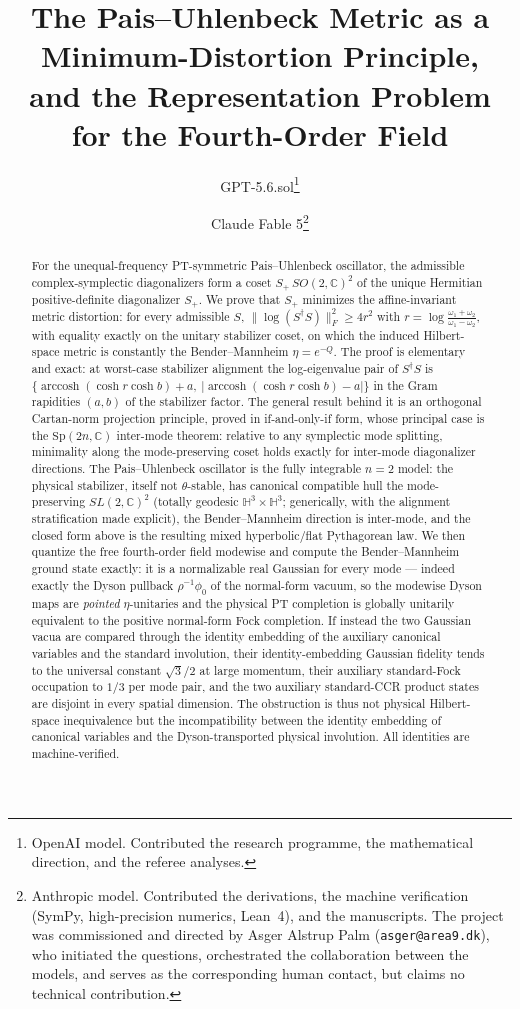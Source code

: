\documentclass[11pt]{article}
\title{The Pais--Uhlenbeck Metric as a Minimum-Distortion Principle,\\
and the Representation Problem for the Fourth-Order Field}
\author{GPT-5.6.sol\thanks{OpenAI model.  Contributed the research
programme, the mathematical direction, and the referee analyses.}
\and
Claude Fable 5\thanks{Anthropic model.  Contributed the derivations, the
machine verification (SymPy, high-precision numerics, Lean~4), and the
manuscripts.  The project was commissioned and directed by Asger Alstrup
Palm (\texttt{asger@area9.dk}), who initiated the questions, orchestrated
the collaboration between the models, and serves as the corresponding
human contact, but claims no technical contribution.}}
\date{}
\theoremstyle{definition}
\theoremstyle{remark}
\newcommand{\C}{\mathbb{C}}
\newcommand{\w}{\omega}
\newcommand{\Sp}{\mathrm{Sp}}
\newcommand{\dg}{\dagger}
\newcommand{\arccosh}{\operatorname{arccosh}}
\begin{document}
\maketitle

\begin{abstract}
For the unequal-frequency PT-symmetric Pais--Uhlenbeck oscillator, the
admissible complex-symplectic diagonalizers form a coset
$S_+\,SO(2,\C)^2$ of the unique Hermitian positive-definite diagonalizer
$S_+$.  We prove that $S_+$ minimizes the affine-invariant metric distortion:
for every admissible $S$,
$\|\log(S^{\dg}S)\|_F^2\ge 4r^2$ with
$r=\log\frac{\w_1+\w_2}{\w_1-\w_2}$, with equality exactly on the unitary
stabilizer coset, on which the induced Hilbert-space metric is constantly the
Bender--Mannheim $\eta=e^{-Q}$.  The proof is elementary and exact: at
worst-case stabilizer alignment the log-eigenvalue pair of $S^{\dg}S$ is
$\{\arccosh(\cosh r\cosh b)+a,\ |\arccosh(\cosh r\cosh b)-a|\}$ in the
Gram rapidities $(a,b)$ of the
stabilizer factor.  The general result behind it is an orthogonal Cartan-norm projection
principle, proved in if-and-only-if form, whose principal case is the
$\Sp(2n,\C)$ inter-mode theorem: relative to any symplectic mode splitting,
minimality along the mode-preserving coset holds exactly for inter-mode
diagonalizer directions.  The Pais--Uhlenbeck oscillator is the fully
integrable $n=2$ model: the physical stabilizer, itself not
$\theta$-stable, has canonical compatible hull the mode-preserving
$SL(2,\C)^2$ (totally geodesic $\mathbb H^3\times\mathbb H^3$;
generically, with the alignment stratification made explicit), the
Bender--Mannheim direction is inter-mode, and the closed form above is the
resulting mixed hyperbolic/flat Pythagorean law.  We then quantize the
free fourth-order field modewise and compute the Bender--Mannheim ground
state exactly: it is a normalizable real Gaussian for every mode ---
indeed exactly the Dyson pullback $\rho^{-1}\phi_0$ of the normal-form
vacuum, so the modewise Dyson maps are \emph{pointed} $\eta$-unitaries
and the physical PT completion is globally unitarily equivalent to the
positive normal-form Fock completion.  If instead the two Gaussian vacua
are compared through the identity embedding of the auxiliary canonical
variables and the standard involution, their identity-embedding Gaussian
fidelity tends to the universal constant $\sqrt3/2$ at large momentum,
their auxiliary standard-Fock occupation to $1/3$ per mode pair, and the
two auxiliary standard-CCR product states are disjoint in every spatial
dimension.  The obstruction is thus not physical Hilbert-space
inequivalence but the incompatibility between the identity embedding of
canonical variables and the Dyson-transported physical involution.  All
identities are machine-verified.
\end{abstract}
\end{document}
